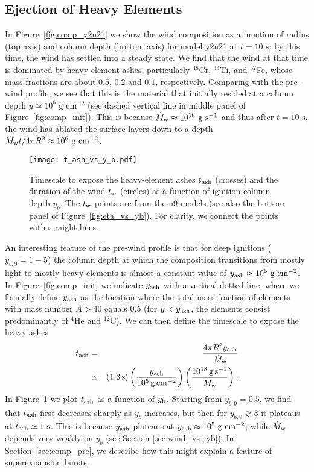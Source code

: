 \documentclass[apj,usenatbib, iop, twocolappendix]{emulateapj}
\newcommand{\Mdot}{\dot{M}_{\rm w}}
\newcommand{\trm}[1]{\textrm{#1}}
\begin{document}
\subsection{Ejection of Heavy Elements}
\label{sec:ejection_of_heavy_elements}

In Figure~\ref{fig:comp_y2n21} we show the wind composition as a function of radius (top axis) and column depth (bottom axis) for model y2n21 at $t=10\trm{ s}$; by this time, the wind has settled into a steady state.  We find that the wind at that time is dominated by heavy-element ashes, particularly $^{48}$Cr, $^{44}$Ti, and $^{52}$Fe, whose mass fractions are about $0.5$, $0.2$  and $0.1$, respectively.  Comparing with the pre-wind profile, we see that this is the material that initially resided at a column depth $y\simeq 10^6\trm{ g cm}^{-2}$ (see dashed vertical line in middle panel of Figure~\ref{fig:comp_init}).  This is because $\Mdot\approx 10^{18}\trm{ g s}^{-1}$ and thus after $t=10\trm{ s}$, the wind has ablated the surface layers down to a depth $\Mdot t/4\pi R^2 \approx 10^6\trm{ g cm}^{-2}$. 

\begin{figure}
\texttt{[image: t\_ash\_vs\_y\_b.pdf]}
\caption{Timescale to expose the heavy-element ashes $t_{\rm ash}$ (crosses) and the duration of the wind $t_{\rm w}$ (circles) as a function of ignition column depth $y_b$.  The $t_{\rm w}$ points are from the n9 models (see also the bottom panel of Figure~\ref{fig:eta_vs_yb}). For clarity, we connect the points with straight lines.}
\label{fig:t_ash_vs_y_b}
\end{figure}

An interesting feature of the pre-wind profile is that  for deep ignitions ($y_{b,9}=1-5$) the column depth at which the composition transitions from mostly light to mostly heavy elements is almost a constant value of $y_{\rm ash}\approx 10^5\trm{ g cm}^{-2}$. In Figure~\ref{fig:comp_init} we indicate $y_{\rm ash}$ with a vertical dotted line, where we formally define $y_{\rm ash}$ as the location  where the total mass fraction of elements with mass number $A>40$ equals 0.5 (for $y<y_{\rm ash}$, the elements consist predominantly of $^4$He and $^{12}$C). We can then define the timescale to expose the heavy ashes
\begin{eqnarray}
t_{\rm ash}&=& \frac{4\pi R^2 y_{\rm ash}}{\dot{M}_{\rm w}}\nonumber \\
&\simeq&\left(1.3\,{\rm s}\right) \left(\frac{y_{\rm ash}}{10^5\,{\rm g\, cm^{-2}}}\right)\left(\frac{10^{18}\,{\rm g\,s^{-1}}}{\dot{M}_{\rm w}}\right).
\end{eqnarray}
In Figure~\ref{fig:t_ash_vs_y_b} we plot $t_{\rm ash}$ as a function of $y_{\rm b}$. 
Starting from $y_{b,9}=0.5$, we find that  $t_{\rm ash}$ first decreases sharply as $y_b$ increases,  but then for  $y_{b,9}\gtrsim 3$ it plateaus at $t_{\rm ash}\simeq 1\trm{ s}$.  This is because $y_{\rm ash}$ plateaus at $y_{\rm ash}\approx 10^5\trm{ g cm}^{-2}$, while $\Mdot$ depends very weakly on $y_b$ (see Section \ref{sec:wind_vs_yb}).  In Section~\ref{sec:comp_pre}, we describe how this might explain a feature of superexpansion bursts.
\end{document}
